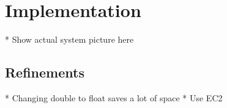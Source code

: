 \section{Implementation}
* Show actual system picture here
\subsection{Refinements}
* Changing double to float saves a lot of space
* Use EC2